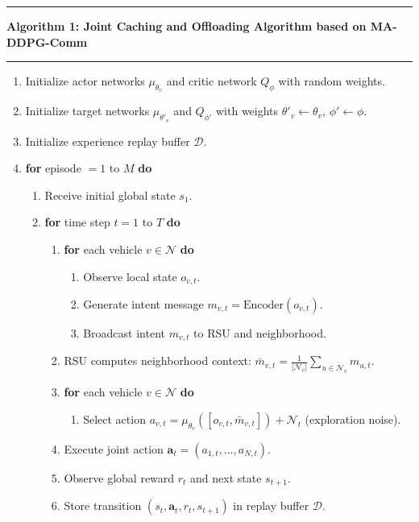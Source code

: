 \documentclass[12pt,a4paper]{report}
\begin{document}
\vspace{0.5cm}
\noindent\rule{\textwidth}{1pt}
\textbf{Algorithm 1: Joint Caching and Offloading Algorithm based on MA-DDPG-Comm} \\
\noindent\rule{\textwidth}{0.5pt}
\begin{enumerate}
    \item Initialize actor networks $\mu_{\theta_v}$ and critic network $Q_{\phi}$ with random weights.
    \item Initialize target networks $\mu_{\theta'_v}$ and $Q_{\phi'}$ with weights $\theta'_v \leftarrow \theta_v$, $\phi' \leftarrow \phi$.
    \item Initialize experience replay buffer $\mathcal{D}$.
    \item \textbf{for} episode $= 1$ to $M$ \textbf{do}
    \begin{enumerate}
        \item Receive initial global state $s_1$.
        \item \textbf{for} time step $t = 1$ to $T$ \textbf{do}
        \begin{enumerate}
            \item \textbf{for} each vehicle $v \in \mathcal{N}$ \textbf{do}
            \begin{enumerate}
                \item Observe local state $o_{v,t}$.
                \item Generate intent message $m_{v,t} = \text{Encoder}(o_{v,t})$.
                \item Broadcast intent $m_{v,t}$ to RSU and neighborhood.
            \end{enumerate}
            \item RSU computes neighborhood context: $\bar{m}_{v,t} = \frac{1}{|\mathcal{N}_v|} \sum_{u \in \mathcal{N}_v} m_{u,t}$.
            \item \textbf{for} each vehicle $v \in \mathcal{N}$ \textbf{do}
            \begin{enumerate}
                \item Select action $a_{v,t} = \mu_{\theta_v}([o_{v,t}, \bar{m}_{v,t}]) + \mathcal{N}_t$ (exploration noise).
            \end{enumerate}
            \item Execute joint action $\boldsymbol{a}_t = (a_{1,t}, \dots, a_{N,t})$.
            \item Observe global reward $r_t$ and next state $s_{t+1}$.
            \item Store transition $(s_t, \boldsymbol{a}_t, r_t, s_{t+1})$ in replay buffer $\mathcal{D}$.

\end{enumerate}
\end{enumerate}
\end{enumerate}
\end{document}
